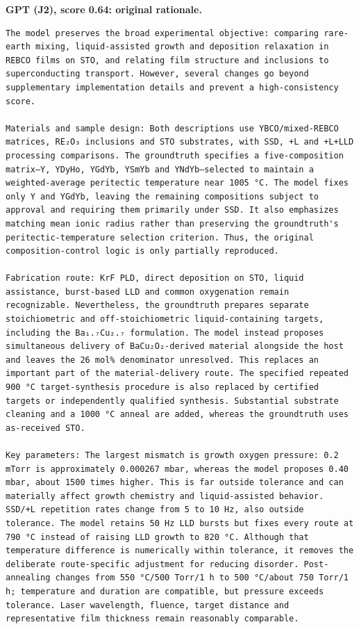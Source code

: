 \noindent\textbf{GPT (J2), score 0.64: original rationale.}
\begin{lstlisting}[style=jsonstyle,basicstyle=\fontsize{8}{9.6}\selectfont\ttfamily,backgroundcolor=\color{white}]
The model preserves the broad experimental objective: comparing rare-earth mixing, liquid-assisted growth and deposition relaxation in REBCO films on STO, and relating film structure and inclusions to superconducting transport. However, several changes go beyond supplementary implementation details and prevent a high-consistency score.

Materials and sample design: Both descriptions use YBCO/mixed-REBCO matrices, RE₂O₃ inclusions and STO substrates, with SSD, +L and +L+LLD processing comparisons. The groundtruth specifies a five-composition matrix—Y, YDyHo, YGdYb, YSmYb and YNdYb—selected to maintain a weighted-average peritectic temperature near 1005 °C. The model fixes only Y and YGdYb, leaving the remaining compositions subject to approval and requiring them primarily under SSD. It also emphasizes matching mean ionic radius rather than preserving the groundtruth's peritectic-temperature selection criterion. Thus, the original composition-control logic is only partially reproduced.

Fabrication route: KrF PLD, direct deposition on STO, liquid assistance, burst-based LLD and common oxygenation remain recognizable. Nevertheless, the groundtruth prepares separate stoichiometric and off-stoichiometric liquid-containing targets, including the Ba₁.₇Cu₂.₇ formulation. The model instead proposes simultaneous delivery of BaCu₂O₂-derived material alongside the host and leaves the 26 mol% denominator unresolved. This replaces an important part of the material-delivery route. The specified repeated 900 °C target-synthesis procedure is also replaced by certified targets or independently qualified synthesis. Substantial substrate cleaning and a 1000 °C anneal are added, whereas the groundtruth uses as-received STO.

Key parameters: The largest mismatch is growth oxygen pressure: 0.2 mTorr is approximately 0.000267 mbar, whereas the model proposes 0.40 mbar, about 1500 times higher. This is far outside tolerance and can materially affect growth chemistry and liquid-assisted behavior. SSD/+L repetition rates change from 5 to 10 Hz, also outside tolerance. The model retains 50 Hz LLD bursts but fixes every route at 790 °C instead of raising LLD growth to 820 °C. Although that temperature difference is numerically within tolerance, it removes the deliberate route-specific adjustment for reducing disorder. Post-annealing changes from 550 °C/500 Torr/1 h to 500 °C/about 750 Torr/1 h; temperature and duration are compatible, but pressure exceeds tolerance. Laser wavelength, fluence, target distance and representative film thickness remain reasonably comparable.


\end{lstlisting}
